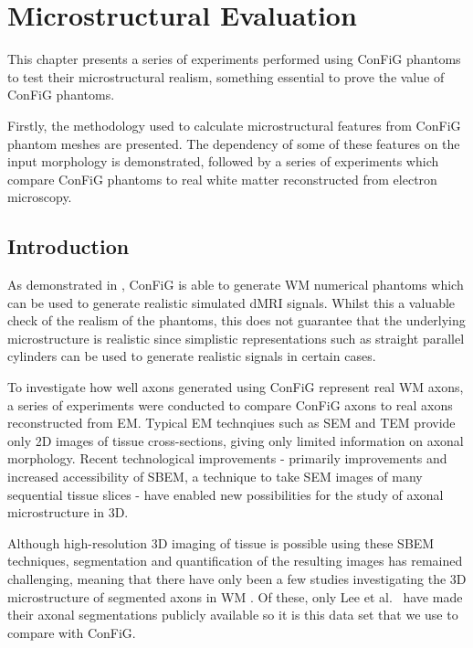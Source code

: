 \chapter{Microstructural Evaluation}
\label{chap:microstructure_eval}

\chaptertoc{}

\begin{chapterabstract}
  This chapter presents a series of experiments performed using \ac{ConFiG} phantoms to test their microstructural realism, something essential to prove the value of \ac{ConFiG} phantoms.

  Firstly, the methodology used to calculate microstructural features from \ac{ConFiG} phantom meshes are presented. The dependency of some of these features on the input morphology is demonstrated, followed by a series of experiments which compare \ac{ConFiG} phantoms to real white matter reconstructed from electron microscopy.
\end{chapterabstract}



\section{Introduction}
\label{sec:micro_introduction}
As demonstrated in , \ac{ConFiG} is able to generate \acf{WM} numerical phantoms which can be used to generate realistic simulated \acf{dMRI} signals. Whilst this a valuable check of the realism of the phantoms, this does not guarantee that the underlying microstructure is realistic since simplistic representations such as straight parallel cylinders can be used to generate realistic signals in certain cases.

To investigate how well axons generated using \ac{ConFiG} represent real \ac{WM} axons, a series of experiments were conducted to compare \ac{ConFiG} axons to real axons reconstructed from \acf{EM}. Typical \ac{EM} technqiues such as \acf{SEM} and \acf{TEM} provide only 2D images of tissue cross-sections, giving only limited information on axonal morphology. Recent technological improvements - primarily improvements and increased accessibility of \acf{SBEM}\cite{Helmstaedter2008,Denk2004}, a technique to take \ac{SEM} images of many sequential tissue slices - have enabled new possibilities for the study of axonal microstructure in 3D.

Although high-resolution 3D imaging of tissue is possible using these \ac{SBEM} techniques, segmentation and quantification of the resulting images has remained challenging, meaning that there have only been a few studies investigating the 3D microstructure of segmented axons in \ac{WM} \cite{Abdollahzadeh2019,Lee2019b,Salo2018}. Of these, only Lee et al.\ \cite{Lee2019b} have made their axonal segmentations publicly available so it is this data set that we use to compare with \ac{ConFiG}.

